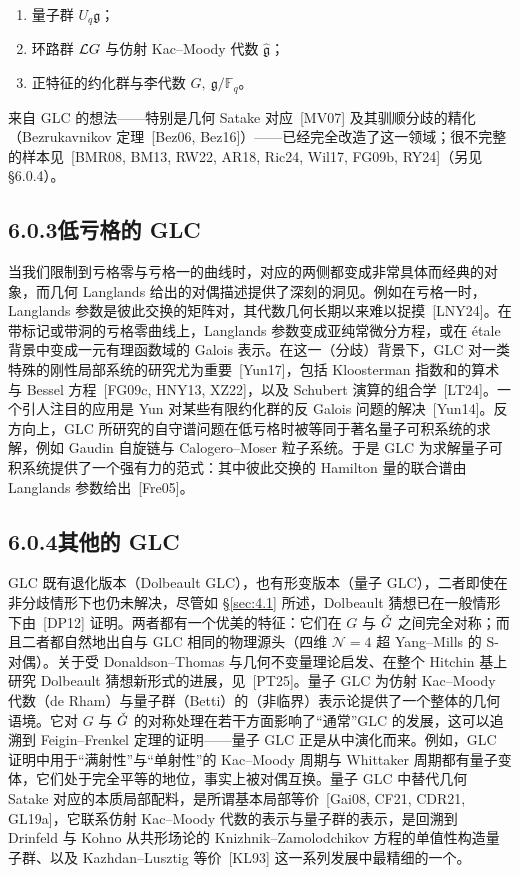 \begin{enumerate}
\item 量子群 $U_{q}\mathfrak{g}$；
\item 环路群 $\mathcal{L}G$ 与仿射 Kac–Moody 代数 $\widehat{\mathfrak{g}}$；
\item 正特征的约化群与李代数 $G,\ \mathfrak{g}/\mathbb{F}_{q}$。
\end{enumerate}

来自 GLC 的想法——特别是几何 Satake 对应~[MV07] 及其驯顺分歧的精化（Bezrukavnikov 定理~[Bez06, Bez16]）——已经完全改造了这一领域；很不完整的样本见~[BMR08, BM13, RW22, AR18, Ric24, Wil17, FG09b, RY24]（另见 \S6.0.4）。

\subsection*{6.0.3\quad 低亏格的 GLC}

当我们限制到亏格零与亏格一的曲线时，对应的两侧都变成非常具体而经典的对象，而几何 Langlands 给出的对偶描述提供了深刻的洞见。例如在亏格一时，Langlands 参数是彼此交换的矩阵对，其代数几何长期以来难以捉摸~[LNY24]。在带标记或带洞的亏格零曲线上，Langlands 参数变成亚纯常微分方程，或在 étale 背景中变成一元有理函数域的 Galois 表示。在这一（分歧）背景下，GLC 对一类特殊的刚性局部系统的研究尤为重要~[Yun17]，包括 Kloosterman 指数和的算术与 Bessel 方程~[FG09c, HNY13, XZ22]，以及 Schubert 演算的组合学~[LT24]。一个引人注目的应用是 Yun 对某些有限约化群的反 Galois 问题的解决~[Yun14]。反方向上，GLC 所研究的自守谱问题在低亏格时被等同于著名量子可积系统的求解，例如 Gaudin 自旋链与 Calogero–Moser 粒子系统。于是 GLC 为求解量子可积系统提供了一个强有力的范式：其中彼此交换的 Hamilton 量的联合谱由 Langlands 参数给出~[Fre05]。

\subsection*{6.0.4\quad 其他的 GLC}

GLC 既有退化版本（Dolbeault GLC），也有形变版本（量子 GLC），二者即使在非分歧情形下也仍未解决，尽管如 \S\ref{sec:4.1} 所述，Dolbeault 猜想已在一般情形下由~[DP12] 证明。两者都有一个优美的特征：它们在 $G$ 与 $\check{G}$ 之间完全对称；而且二者都自然地出自与 GLC 相同的物理源头（四维 $\mathcal{N}=4$ 超 Yang–Mills 的 S-对偶）。关于受 Donaldson–Thomas 与几何不变量理论启发、在整个 Hitchin 基上研究 Dolbeault 猜想新形式的进展，见~[PT25]。量子 GLC 为仿射 Kac–Moody 代数（de Rham）与量子群（Betti）的（非临界）表示论提供了一个整体的几何语境。它对 $G$ 与 $\check{G}$ 的对称处理在若干方面影响了“通常”GLC 的发展，这可以追溯到 Feigin–Frenkel 定理的证明——量子 GLC 正是从中演化而来。例如，GLC 证明中用于“满射性”与“单射性”的 Kac–Moody 周期与 Whittaker 周期都有量子变体，它们处于完全平等的地位，事实上被对偶互换。量子 GLC 中替代几何 Satake 对应的本质局部配料，是所谓基本局部等价~[Gai08, CF21, CDR21, GL19a]，它联系仿射 Kac–Moody 代数的表示与量子群的表示，是回溯到 Drinfeld 与 Kohno 从共形场论的 Knizhnik–Zamolodchikov 方程的单值性构造量子群、以及 Kazhdan–Lusztig 等价~[KL93] 这一系列发展中最精细的一个。


